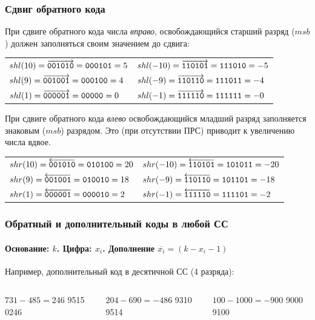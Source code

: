 \begin{frame}
    \frametitle{Сдвиг обратного кода}
    При сдвиге обратного кода числа \emph{вправо}, освобождающийся старший разряд ($msb$) должен заполняться своим значением до сдвига:
    \begin{tabular}{l|l}
        $shl(10)=\overrightarrow{\texttt{001010}}=\texttt{000101}=5$
            & $shl(-10)=\overrightarrow{\texttt{110101}}=\texttt{111010}=-5$ \\
        $shl(9)=\overrightarrow{\texttt{001001}}=\texttt{000100}=4$
            & $shl(-9)=\overrightarrow{\texttt{110110}}=\texttt{111011}=-4$ \\
        $shl(1)=\overrightarrow{\texttt{000001}}=\texttt{00000}=0$
            & $shl(-1)=\overrightarrow{\texttt{111110}}=\texttt{111111}=-0$ \\
    \end{tabular}
    
    При сдвиге обратного кода \emph{влево} освобождающийся младший разряд заполняется знаковым ($msb$) разрядом. Это (при отсутствии ПРС) приводит к увеличению числа вдвое.
    \begin{tabular}{l|l}
        $shr(10)=\overleftarrow{\texttt{001010}}=\texttt{010100}=20$
            & $shr(-10)=\overleftarrow{\texttt{110101}}=\texttt{101011}=-20$ \\
        $shr(9)=\overleftarrow{\texttt{001001}}=\texttt{010010}=18$
            & $shr(-9)=\overleftarrow{\texttt{110110}}=\texttt{101101}=-18$ \\
        $shr(1)=\overleftarrow{\texttt{000001}}=\texttt{000010}=2$
            & $shr(-1)=\overleftarrow{\texttt{111110}}=\texttt{111101}=-2$ \\
    \end{tabular}
    
\end{frame}

\begin{frame}
    \frametitle{Обратный и дополнительный коды в любой СС}
    \framesubtitle{Основание: $k$. Цифра: $x_i$. Дополнение $\overline{x_i}=(k - x_i - 1)$}
    
    Например, дополнительный код в десятичной СС (4 разряда):
    \begin{columns}
            \begin{block}{$731-485=246$}
                 \center
                          {9515}
                          {0246}
            \end{block}
            \begin{block}{$204-690=-486$}
                 \center
                          {9310}
                          {9514}
            \end{block}
            \begin{block}{$100-1000=-900$}
                 \center
                          {9000}
                          {9100}
            \end{block}
    \end{columns}
\end{frame}


